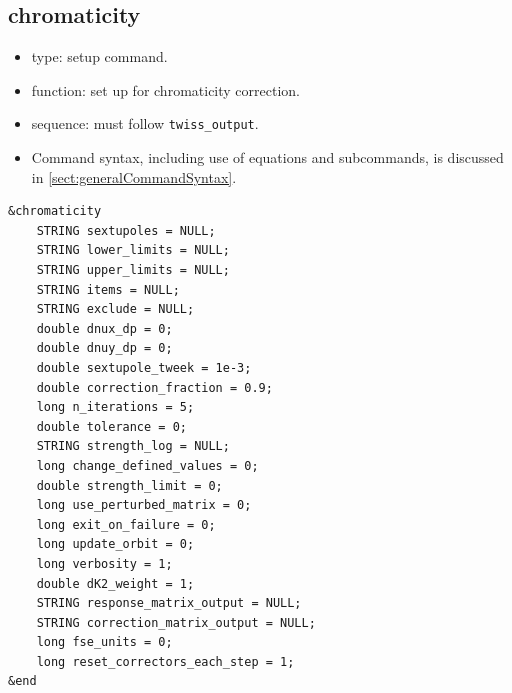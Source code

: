 \documentclass[11pt]{article}
\begin{document}
\subsection{chromaticity \label{subsec:chromaticity}}

\begin{itemize}
\item type: setup command.
\item function: set up for chromaticity correction.
\item sequence: must follow \verb|twiss_output|.
\item Command syntax, including use of equations and subcommands, is discussed in \ref{sect:generalCommandSyntax}.
\end{itemize}

\begin{verbatim}
&chromaticity
    STRING sextupoles = NULL;
    STRING lower_limits = NULL;
    STRING upper_limits = NULL;
    STRING items = NULL;
    STRING exclude = NULL;
    double dnux_dp = 0;
    double dnuy_dp = 0;
    double sextupole_tweek = 1e-3;
    double correction_fraction = 0.9;
    long n_iterations = 5;
    double tolerance = 0;
    STRING strength_log = NULL;
    long change_defined_values = 0;
    double strength_limit = 0;
    long use_perturbed_matrix = 0;    
    long exit_on_failure = 0;
    long update_orbit = 0;
    long verbosity = 1;
    double dK2_weight = 1;
    STRING response_matrix_output = NULL;
    STRING correction_matrix_output = NULL;
    long fse_units = 0;
    long reset_correctors_each_step = 1;
&end
\end{verbatim}
\end{document}
